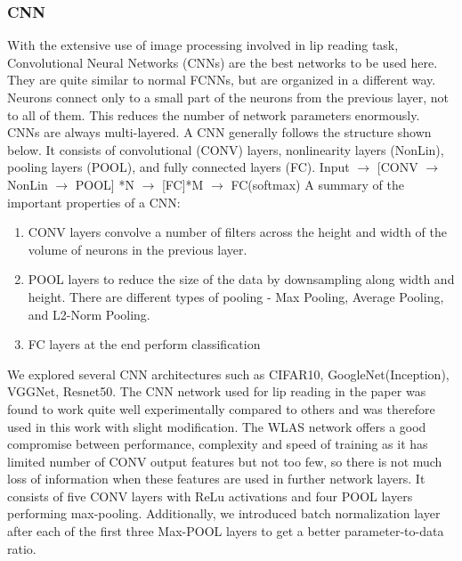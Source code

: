 \documentclass{article}
\begin{document}
\subsubsection{CNN}
With the extensive use of image processing involved in lip reading task, Convolutional Neural Networks (CNNs) are the best networks to be used here\cite{Imagenet}. They are quite similar to normal FCNNs, but are organized in a different way. Neurons connect only to a small part of the neurons from the previous layer, not to all of them. This reduces the number of network parameters enormously. CNNs are always multi-layered.
A CNN generally follows the structure shown below. It consists of convolutional (CONV) layers, nonlinearity layers (NonLin), pooling layers (POOL), and fully connected layers (FC).
\newline
\newline
Input $\rightarrow$ [CONV $\rightarrow$ NonLin $\rightarrow$ POOL] *N $\rightarrow$ [FC]*M $\rightarrow$ FC(softmax)
\newline
\newline
A summary of the important properties of a CNN:
\begin{enumerate}
\item CONV layers convolve a number of filters across the height and width of the volume of neurons in the previous layer.
\item POOL layers to reduce the size of the data by downsampling along width and height. There are different types of pooling - Max Pooling, Average Pooling, and L2-Norm Pooling.
\item FC layers at the end perform classification
\end{enumerate}
We explored several CNN architectures such as CIFAR10, GoogleNet(Inception), VGGNet, Resnet50. The CNN network used for lip reading in the paper \cite{LipreadingInWild} was found to work quite well experimentally compared to others and was therefore used in this work with slight modification. The WLAS network offers a good compromise between performance, complexity and speed of training as it has limited number of CONV output features but not too few, so there is not much loss of information when these features are used in further network layers. It consists of five CONV layers with ReLu activations and four POOL layers performing max-pooling. Additionally, we introduced batch normalization\cite{BatchNormalization} layer after each of the first three Max-POOL layers to get a better parameter-to-data ratio. 
\end{document}
